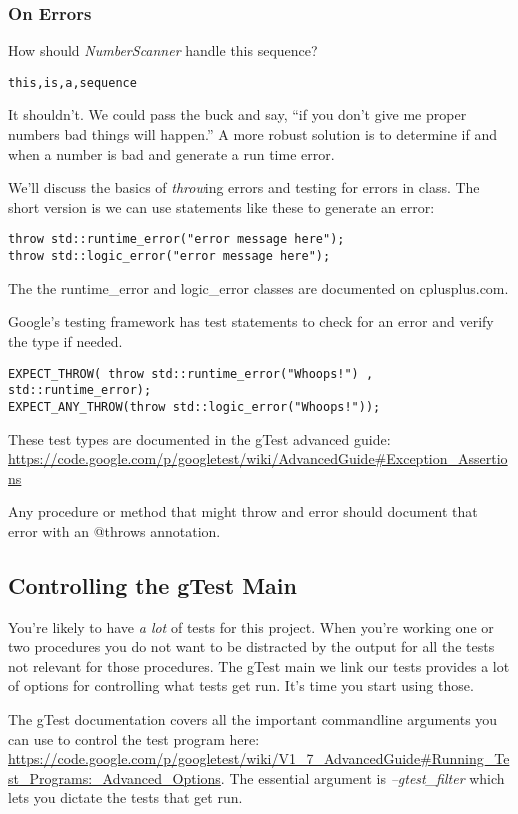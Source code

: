\documentclass[10pt]{article}
\begin{document}
\subsubsection{On Errors}

How should \textit{NumberScanner} handle this sequence?
\begin{verbatim}
this,is,a,sequence
\end{verbatim}
It shouldn't. We could pass the buck and say, ``if you don't give me proper numbers bad things will happen.''  A more robust solution is to determine if and when a number is bad and generate a run time error. 

We'll discuss the basics of \textit{throw}ing errors and testing for errors in class.  	The short version is we can use statements like these to generate an error:
\begin{verbatim}
throw std::runtime_error("error message here");
throw std::logic_error("error message here");
\end{verbatim}
The the runtime\_error and logic\_error classes are documented on cplusplus.com. 

Google's testing framework has test statements to check for an error and verify the type if needed. 
\begin{verbatim}
EXPECT_THROW( throw std::runtime_error("Whoops!") , std::runtime_error);
EXPECT_ANY_THROW(throw std::logic_error("Whoops!"));
\end{verbatim}
These test types are documented in the gTest advanced guide: \url{https://code.google.com/p/googletest/wiki/AdvancedGuide#Exception_Assertions}

Any procedure or method that might throw and error should document that error with an @throws annotation.

\subsection{Controlling the gTest Main}

You're likely to have \textit{a lot} of tests  for this project. When you're working one or two procedures you do not want to be distracted by the output for all the tests not relevant for those procedures. The gTest main we link our tests provides a lot of options for controlling what tests get run. It's time you start using those. 

The gTest documentation covers all the important commandline arguments you can use to control the test program here: \url{https://code.google.com/p/googletest/wiki/V1_7_AdvancedGuide#Running_Test_Programs:_Advanced_Options}. The essential argument is \textit{--gtest\_filter} which lets you dictate the tests that get run. 
\end{document}

